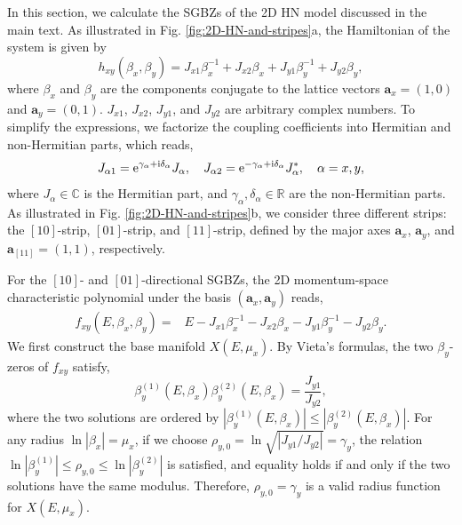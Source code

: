 In this section, we calculate the SGBZs of the 2D HN model discussed
in the main text. As illustrated in Fig. \ref{fig:2D-HN-and-stripes}a,
the Hamiltonian of the system is given by 
\begin{equation}
h_{xy}\left(\beta_{x},\beta_{y}\right)=J_{x1}\beta_{x}^{-1}+J_{x2}\beta_{x}+J_{y1}\beta_{y}^{-1}+J_{y2}\beta_{y},\label{eq:HN-model}
\end{equation}
where $\beta_{x}$ and $\beta_{y}$ are the components conjugate to
the lattice vectors $\mathbf{a}_{x}=(1,0)$ and $\mathbf{a}_{y}=(0,1)$.
$J_{x1}$, $J_{x2}$, $J_{y1}$, and $J_{y2}$ are arbitrary complex
numbers. To simplify the expressions, we factorize the coupling coefficients
into Hermitian and non-Hermitian parts, which reads, 
\begin{equation}
J_{\alpha1}=\mathrm{e}^{\gamma_{\alpha}+\mathrm{i}\delta_{\alpha}}J_{\alpha},\quad J_{\alpha2}=\mathrm{e}^{-\gamma_{\alpha}+\mathrm{i}\delta_{\alpha}}J_{\alpha}^{*},\quad\alpha=x,y,
\end{equation}
where $J_{\alpha}\in\mathbb{C}$ is the Hermitian part, and $\gamma_{\alpha},\delta_{\alpha}\in\mathbb{R}$
are the non-Hermitian parts. As illustrated in Fig. \ref{fig:2D-HN-and-stripes}b,
we consider three different strips: the $[10]$-strip, $[01]$-strip,
and $[11]$-strip, defined by the major axes $\mathbf{a}_{x}$, $\mathbf{a}_{y}$,
and $\mathbf{a}_{[11]}=(1,1)$, respectively.

For the $[10]$- and $[01]$-directional SGBZs, the 2D momentum-space
characteristic polynomial under the basis $(\mathbf{a}_{x},\mathbf{a}_{y})$
reads, 
\begin{align}
f_{xy}\left(E,\beta_{x},\beta_{y}\right)= & E-J_{x1}\beta_{x}^{-1}-J_{x2}\beta_{x}-J_{y1}\beta_{y}^{-1}-J_{y2}\beta_{y}.
\end{align}
We first construct the base manifold $X(E,\mu_{x})$. By Vieta's formulas,
the two $\beta_{y}$-zeros of $f_{xy}$ satisfy, 
\begin{equation}
\beta_{y}^{(1)}\left(E,\beta_{x}\right)\beta_{y}^{(2)}\left(E,\beta_{x}\right)=\frac{J_{y1}}{J_{y2}},\label{eq:Vieta-theorem-xy}
\end{equation}
where the two solutions are ordered by $|\beta_{y}^{(1)}(E,\beta_{x})|\leq|\beta_{y}^{(2)}(E,\beta_{x})|$.
For any radius $\ln|\beta_{x}|=\mu_{x}$, if we choose $\rho_{y,0}=\ln\sqrt{|J_{y1}/J_{y2}|}=\gamma_{y}$,
the relation $\ln|\beta_{y}^{(1)}|\leq\rho_{y,0}\leq\ln|\beta_{y}^{(2)}|$
is satisfied, and equality holds if and only if the two solutions
have the same modulus. Therefore, $\rho_{y,0}=\gamma_{y}$ is a valid
radius function for $X(E,\mu_{x})$.

